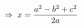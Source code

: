 \documentclass[preview]{standalone}
\begin{document}
\begin{align*}
\special{dvisvgm:raw <g id='unique000'>}\Rightarrow\; x = \frac{a^2 - b^2 + c^2}{2a}\special{dvisvgm:raw </g>}
\end{align*}
\end{document}
